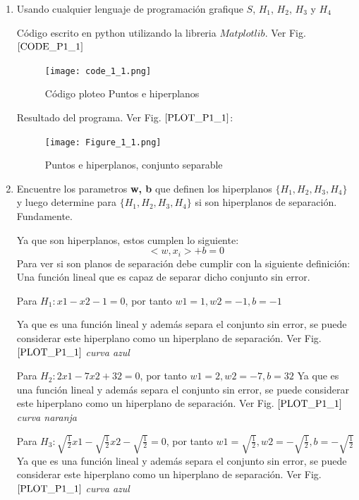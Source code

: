 \documentclass{article}
\begin{document}
\begin{enumerate}
    \item Usando cualquier lenguaje de programación grafique $S$, $H_1$, $H_2$, $H_3$ y $H_4$
    
    Código escrito en python utilizando la libreria $Matplotlib$. Ver Fig.$\ref{CODE_P1_1}$
    \begin{figure}[h]
            \label{CODE_P1_1}
            \centering
            \texttt{[image: code\_1\_1.png]}
            \caption{Código ploteo Puntos e hiperplanos}
    \end{figure}

    Resultado del programa. Ver Fig. $\ref{PLOT_P1_1}$:
    \begin{figure}[h]
        \label{PLOT_P1_1}
        \centering
        \texttt{[image: Figure\_1\_1.png]}
        \caption{Puntos e hiperplanos, conjunto separable}
    \end{figure}

    \item Encuentre los parametros \textbf{w, b} que definen los hiperplanos
    $\{H_1, H_2, H_3, H_4\}$ y luego determine para $\{H_1, H_2, H_3, H_4\}$ si son hiperplanos de separación.
    Fundamente.

    Ya que son hiperplanos, estos cumplen lo siguiente:
    \[
        < {w}, {x_i}> + b = 0  
    \]
    Para ver si son planos de separación debe cumplir con la siguiente definición: Una función
    lineal que es capaz de separar dicho conjunto sin error.

    Para $H_1: x1 - x2 - 1 = 0$, por tanto $w1 = 1, w2 = -1, b = -1$
    
    Ya que es una función lineal y además separa el conjunto sin error, se puede considerar este hiperplano 
    como un hiperplano de separación. Ver Fig. $\ref{PLOT_P1_1}$ \textit{curva azul}

    Para $H_2: 2x1 - 7x2 + 32 = 0$, por tanto $w1 = 2, w2 = -7, b = 32$
    Ya que es una función lineal y además separa el conjunto sin error, se puede considerar este hiperplano 
    como un hiperplano de separación. Ver Fig. $\ref{PLOT_P1_1}$ \textit{curva naranja}

    Para $H_3: \sqrt{\frac{1}{2}}x1 - \sqrt{\frac{1}{2}}x2 - \sqrt{\frac{1}{2}} = 0$, por tanto $w1 = \sqrt{\frac{1}{2}}, w2 = -\sqrt{\frac{1}{2}}, b = -\sqrt{\frac{1}{2}}$
    Ya que es una función lineal y además separa el conjunto sin error, se puede considerar este hiperplano 
    como un hiperplano de separación. Ver Fig. $\ref{PLOT_P1_1}$ \textit{curva azul}


\end{enumerate}
\end{document}
